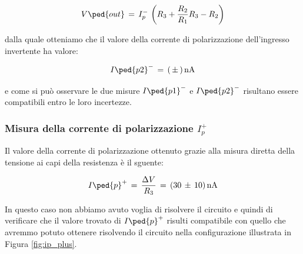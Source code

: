 \begin{equation}
	V\ped{out}\,=\,I_{p}^-\,\left(R_3+\frac{R_2}{R_1}R_3-R_2\right)
\end{equation}

dalla quale otteniamo che il valore della corrente di polarizzazione dell'ingresso invertente ha valore:

\begin{equation}
	I\ped{p2}^-\,=\,(\,\pm\,)\,\SI{}{\nano\ampere}
\end{equation}

e come si può osservare le due misure $I\ped{p1}^-$ e $I\ped{p2}^-$ risultano essere compatibili entro le loro incertezze.

\subsubsection*{Misura della corrente di polarizzazione $I_{p}^+$}

Il valore della corrente di polarizzazione ottenuto grazie alla misura diretta della tensione ai capi della resistenza è il sguente:

\begin{equation}
	I\ped{p}^+\,=\,\frac{\Delta V}{R_3}\,=\,(30\,\pm\,10)\,\SI{}{\nano\ampere}
\end{equation}

In questo caso non abbiamo avuto voglia di risolvere il circuito e quindi di verificare che il valore trovato di $I\ped{p}^+$ risulti compatibile con quello che avremmo potuto ottenere risolvendo il circuito nella configurazione illustrata in Figura \ref{fig:ip_plus}.